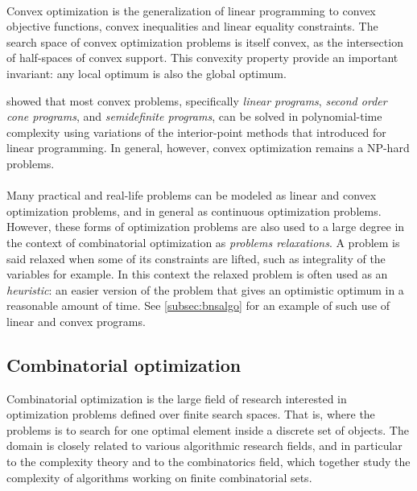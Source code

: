 	\paragraph{}
	Convex optimization is the generalization of linear programming to convex objective functions, convex inequalities and linear equality constraints.
	The search space of convex optimization problems is itself convex, as the intersection of half-spaces of convex support.
	This convexity property provide an important invariant: any local optimum is also the global optimum.

	\Textcite{nesterov1994interior} showed that most convex problems, specifically \emph{linear programs}, \emph{second order cone programs}, and \emph{semidefinite programs}, can be solved in polynomial-time complexity using variations of the interior-point methods that \textcite{karmarkar1984new} introduced for linear programming.
	In general, however, convex optimization remains a NP-hard problems. %

	\paragraph{}
	Many practical and real-life problems can be modeled as linear and convex optimization problems, and in general as continuous optimization problems.
	However, these forms of optimization problems are also used to a large degree in the context of combinatorial optimization as \emph{problems relaxations}.
	A problem is said relaxed when some of its constraints are lifted, such as integrality of the variables for example.
	In this context the relaxed problem is often used as an \emph{heuristic}: an easier version of the problem that gives an optimistic optimum in a reasonable amount of time.
	See \cref{subsec:bnsalgo} for an example of such use of linear and convex programs.

	\subsection{Combinatorial optimization}
	\label{subsec:combio}
	Combinatorial optimization is the large field of research interested in optimization problems defined over finite search spaces.
	That is, where the problems is to search for one optimal element inside a discrete set of objects.
	The domain is closely related to various algorithmic research fields, and in particular to the complexity theory and to the combinatorics field, which together study the complexity of algorithms working on finite combinatorial sets.

